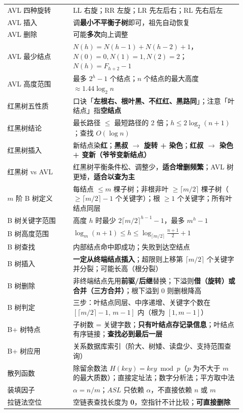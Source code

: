 \documentclass[11pt,openany,UTF8]{ctexbook}
\begin{document}
\begin{longtable}{@{}L{0.2664\linewidth}L{0.6793\linewidth}@{}}
AVL 四种旋转 & LL 右旋；RR 左旋；LR 先左后右；RL 先右后左 \\
AVL 插入 & 调\textbf{最小不平衡子树}即可，祖先自动恢复 \\
AVL 删除 & 可能\textbf{多次}向上调整 \\
AVL 最少结点 & $N(h)=N(h-1)+N(h-2)+1$，$N(0)=0,N(1)=1,N(2)=2$；$N(h)=F_{h+2}-1$ \\
AVL 高度范围 & 最多 $2^h-1$ 个结点；$n$ 个结点的最大高度 $\approx1.44\log_2n$ \\
红黑树五性质 & 口诀「\textbf{左根右、根叶黑、不红红、黑路同}」；注意「叶结点」指\textbf{空结点} \\
红黑树结论 & 最长路径 $\le$ 最短路径的 2 倍；$h\le 2\log_2(n+1)$；查找 $O(\log n)$ \\
红黑树插入 & 新结点染\textbf{红}；\textbf{黑叔 $\to$ 旋转 + 染色}；\textbf{红叔 $\to$ 染色 + 变新（爷爷变新结点）} \\
红黑树 vs AVL & 红黑树平衡条件松、调整少，\textbf{适合增删频繁}；AVL 树更矮，\textbf{适合以查为主} \\
$m$ 阶 B 树定义 & 每结点 $\le m$ 棵子树；非根非叶 $\ge\lceil m/2\rceil$ 棵子树（$\ge\lceil m/2\rceil-1$ 个关键字）；根 $\ge1$ 个关键字；所有叶结点同层 \\
B 树关键字范围 & 高度 $h$ 时最少 $2\lceil m/2\rceil^{h-1}-1$，最多 $m^h-1$ \\
B 树高度范围 & $\log_m(n+1)\le h\le\log_{\lceil m/2\rceil}\frac{n+1}{2}+1$ \\
B 树查找 & 内部结点命中即成功；失败到达空结点 \\
B 树插入 & \textbf{一定从终端结点插入}；超限则上移第 $\lceil m/2\rceil$ 个关键字并分裂；可能长高（根分裂） \\
B 树删除 & 非终端结点先用\textbf{前驱/后继}替换；下溢则\textbf{借（旋转）或合并（三方合并）}；根下溢到 0 则删根降高 \\
B 树判定 & 三步：叶结点同层、中序递增、关键字个数在 $[\lceil m/2\rceil-1,\,m-1]$ 内（根为 $[1,m-1]$） \\
B+ 树特点 & 子树数 = 关键字数；\textbf{只有叶结点存记录信息}；叶结点有序链接；\textbf{查找必到最后一层} \\
B+ 树应用 & 关系数据库索引（阶大、树矮、读盘少、支持范围查询） \\
散列函数 & 除留余数法 $H(key)=key\bmod p$（$p$ 为不大于 $m$ 的最大质数）；直接定址法；数字分析法；平方取中法 \\
装填因子 & $\alpha=n/m$；$ASL$ 只依赖 $\alpha$，不直接依赖 $n$ 或 $m$ \\
拉链法空位 & 空链表查找长度为 \textbf{0}，空指针不计比较；\textbf{可直接删除} \\

\end{longtable}
\end{document}
